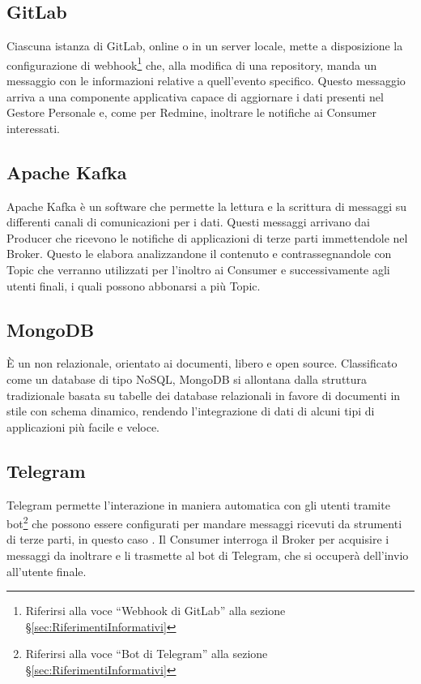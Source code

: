 		\subsection{GitLab}
		Ciascuna istanza di GitLab, online o in un server locale,
        mette a disposizione la configurazione di webhook\footnote{Riferirsi alla voce ``Webhook di GitLab'' alla sezione \S\ref{sec:RiferimentiInformativi}}
        che, alla modifica di una repository, manda un messaggio con le informazioni relative a quell'evento specifico.
        Questo messaggio arriva a una componente applicativa capace di
        aggiornare i dati presenti nel Gestore Personale e, come per Redmine, inoltrare le notifiche ai Consumer interessati.
		
		\subsection{Apache Kafka}
		Apache Kafka è un software  che permette la lettura e la scrittura di messaggi su differenti canali di comunicazioni per i dati.
		Questi messaggi arrivano dai Producer che ricevono le notifiche di applicazioni di terze parti immettendole nel Broker. Questo le elabora analizzandone
        il contenuto e contrassegnandole con Topic che verranno utilizzati per l'inoltro ai Consumer e successivamente agli utenti finali, i quali possono abbonarsi a più Topic.
		
        \subsection{MongoDB}
        È un  non relazionale, orientato ai documenti, libero e open source. Classificato come un database di tipo NoSQL, MongoDB si allontana dalla struttura tradizionale basata su tabelle dei database relazionali in favore di documenti in stile  con schema dinamico, rendendo l'integrazione di dati di alcuni tipi di applicazioni più facile e veloce.
        
		\subsection{Telegram}
		Telegram permette l'interazione in maniera automatica con gli utenti tramite
        bot\footnote{Riferirsi alla voce ``Bot di Telegram'' alla sezione \S\ref{sec:RiferimentiInformativi}}
        che possono essere configurati per mandare messaggi ricevuti da strumenti di terze parti, in questo caso \progetto.
        Il Consumer interroga il Broker per acquisire i messaggi da inoltrare e li trasmette al bot di Telegram, che si
        occuperà dell'invio all'utente finale.

